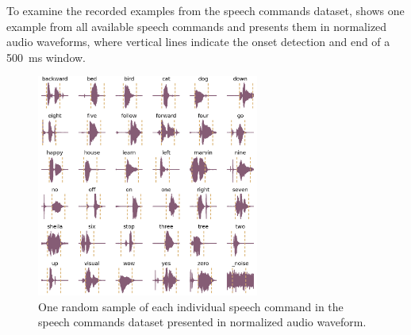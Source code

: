To examine the recorded examples from the speech commands dataset,  shows one example from all available speech commands and presents them in normalized audio waveforms, where vertical lines indicate the onset detection and end of a \SI{500}{\milli\second} window.
\begin{figure}[!ht]
  \centering
    \includegraphics[width=0.65\textwidth]{./5_exp/figs/exp_dataset_speech_cmd_wav_grid.png}
  \caption{One random sample of each individual speech command in the speech commands dataset presented in normalized audio waveform.}
  \label{fig:exp_dataset_speech_cmd_wav_grid}
\end{figure}
\FloatBarrier
\noindent



